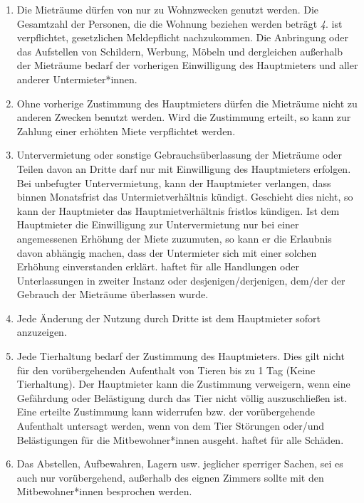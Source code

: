 \documentclass{scrreprt}[12pt,a4paper,twoside,duplex]
\begin{document}
\begin{contract}
\label{clause:benutzung}
\begin{enumerate}
	\item Die Mieträume dürfen  von  nur zu Wohnzwecken genutzt werden. Die 	Gesamtzahl der Personen, die die Wohnung beziehen werden beträgt \textsl{4}.  ist verpflichtet,  gesetzlichen Meldepflicht nachzukommen. Die Anbringung oder das Aufstellen von Schildern, Werbung, Möbeln und dergleichen au{\ss}erhalb der Mieträume bedarf der vorherigen Einwilligung des Hauptmieters und aller anderer Untermieter*innen.	

	\item Ohne vorherige Zustimmung des Hauptmieters dürfen die Mieträume nicht zu anderen Zwecken benutzt werden. Wird die Zustimmung erteilt, so kann  zur Zahlung einer erhöhten Miete verpflichtet werden.

	\item Untervermietung oder sonstige Gebrauchsüberlassung der Mieträume oder Teilen davon an Dritte darf nur mit Einwilligung des Hauptmieters erfolgen. Bei unbefugter Untervermietung, kann der Hauptmieter verlangen, dass  binnen Monatsfrist das Untermietverhältnis kündigt. Geschieht dies nicht, so kann der Hauptmieter das Hauptmietverhältnis fristlos kündigen. Ist dem Hauptmieter die Einwilligung zur Untervermietung nur bei einer angemessenen
	Erhöhung der Miete zuzumuten, so kann er die Erlaubnis davon abhängig machen, dass der Untermieter sich mit einer solchen Erhöhung einverstanden erklärt.  haftet für alle Handlungen oder Unterlassungen  in zweiter Instanz oder desjenigen/derjenigen, dem/der der Gebrauch der Mieträume überlassen wurde.
 
	\item Jede Änderung der Nutzung durch Dritte ist dem Hauptmieter sofort anzuzeigen.
	
	\item Jede Tierhaltung bedarf der Zustimmung des Hauptmieters. Dies gilt nicht für den vo\-rü\-ber\-geh\-end\-en Aufenthalt von Tieren bis zu 1 Tag (Keine Tierhaltung). Der Hauptmieter kann die Zustimmung verweigern, wenn eine Gefährdung oder Belästigung durch das Tier nicht völlig auszuschlie{\ss}en ist. Eine erteilte Zustimmung kann widerrufen bzw. der vorübergehende Aufenthalt untersagt werden, wenn von dem Tier Störungen oder/und Belästigungen für die Mitbewohner*innen ausgeht.  haftet für alle Schäden.
	
	\item Das Abstellen, Aufbewahren, Lagern usw. jeglicher sperriger Sachen, sei es auch nur vo\-rü\-ber\-geh\-end, au{\ss}erhalb des eignen Zimmers sollte mit den Mitbewohner*innen besprochen werden.
\end{enumerate}
\end{contract}
\end{document}
